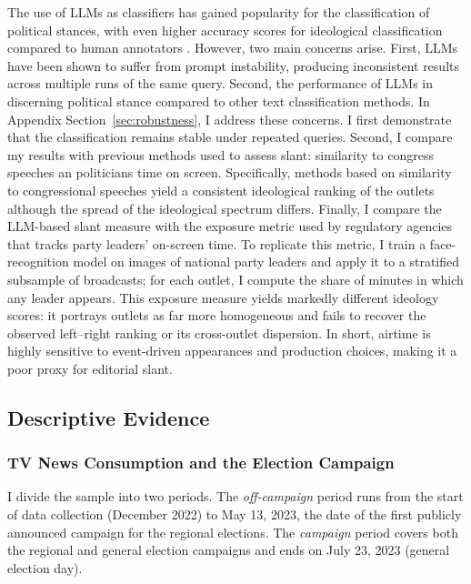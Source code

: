 \documentclass[12pt]{article}
\begin{document}
	The use of LLMs as classifiers has gained popularity for the classification of political stances, with even higher accuracy scores for ideological classification compared to human annotators \citep[see, e.g.,][]{lemens,tornberg2023,Gilardi2023ChatGPTOC}. However, two main concerns arise. First, LLMs have been shown to suffer from prompt instability, producing inconsistent results across multiple runs of the same query. Second, the performance of LLMs  in discerning political stance compared to other text classification methods. In Appendix Section~\ref{sec:robustness}, I address these concerns. 	I first demonstrate that the classification remains stable under repeated queries. Second, I compare my results with previous methods used to assess slant: similarity to congress speeches an politicians time on screen. Specifically, methods based on similarity to congressional speeches \citep{gentzkow2010media,laver2003extracting} yield a consistent ideological ranking of the outlets although the spread of the ideological spectrum differs. Finally, I compare the LLM-based slant measure with the exposure metric used by regulatory agencies that tracks party leaders’ on-screen time. To replicate this metric, I train a face-recognition model on images of national party leaders and apply it to a stratified subsample of broadcasts; for each outlet, I compute the share of minutes in which any leader appears. This exposure measure yields markedly different ideology scores: it portrays outlets as far more homogeneous and fails to recover the observed left–right ranking or its cross-outlet dispersion. In short, airtime is highly sensitive to event-driven appearances and production choices, making it a poor proxy for editorial slant. 	
	
	

	\subsection{Descriptive Evidence}


	\subsubsection*{TV News Consumption and the Election Campaign}

	
	
	
	I divide the sample into two periods. The \textit{off-campaign} period runs from the start of data collection (December 2022) to May 13, 2023, the date of the first publicly announced campaign for the regional elections. The \textit{campaign} period covers both the regional and general election campaigns and ends on July 23, 2023 (general election day). 
	
\end{document}
